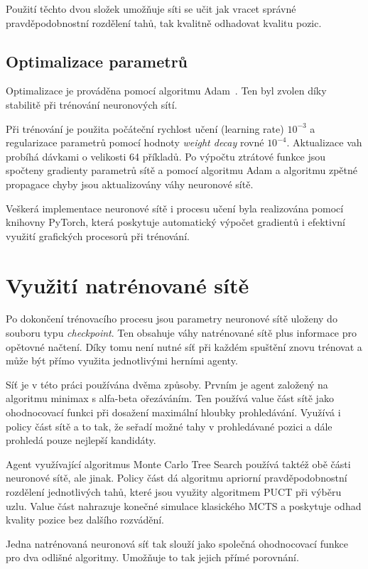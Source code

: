 Použití těchto dvou složek umožňuje síti se učit jak vracet správné pravděpodobnostní rozdělení tahů, tak kvalitně odhadovat
kvalitu pozic. 

\subsection{Optimalizace parametrů}

Optimalizace je prováděna pomocí algoritmu Adam~\cite{kingma2015adam}. Ten byl zvolen díky stabilitě při trénování neuronových sítí. 

Při trénování je použita počáteční rychlost učení (learning rate) $10^{-3}$ a regularizace parametrů pomocí hodnoty \emph{weight decay} rovné $10^{-4}$.
Aktualizace vah probíhá dávkami o velikosti 64 příkladů. Po výpočtu ztrátové funkce jsou spočteny gradienty parametrů sítě a pomocí algoritmu Adam a 
algoritmu zpětné propagace chyby jsou aktualizovány váhy neuronové sítě.

Veškerá implementace neuronové sítě i procesu učení byla realizována pomocí knihovny PyTorch, která poskytuje automatický výpočet gradientů i 
efektivní využití grafických procesorů při trénování.

\section{Využití natrénované sítě}

Po dokončení trénovacího procesu jsou parametry neuronové sítě uloženy do souboru typu \emph{checkpoint}. Ten obsahuje váhy natrénované sítě plus informace pro 
opětovné načtení. Díky tomu není nutné síť při každém spuštění znovu trénovat a může být přímo využita jednotlivými herními agenty.

Síť je v této práci používána dvěma způsoby. Prvním je agent založený na algoritmu minimax s alfa-beta ořezáváním. Ten používá value část sítě jako ohodnocovací 
funkci při dosažení maximální hloubky prohledávání. Využívá i policy část sítě a to tak, že seřadí možné tahy v prohledávané pozici a dále prohledá
pouze nejlepší kandidáty.

Agent využívající algoritmus Monte Carlo Tree Search používá taktéž obě části neuronové sítě, ale jinak. Policy část dá algoritmu apriorní 
pravděpodobnostní rozdělení jednotlivých tahů, které jsou využity algoritmem PUCT při výběru uzlu. Value část nahrazuje konečné simulace 
klasického MCTS a poskytuje odhad kvality pozice bez dalšího rozvádění.

Jedna natrénovaná neuronová síť tak slouží jako společná ohodnocovací funkce pro dva odlišné algoritmy. Umožňuje to tak jejich přímé porovnání.

